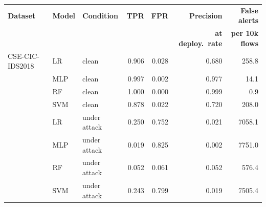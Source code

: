 \begin{tabular}{l l l r r r r}
\toprule
\textbf{Dataset} & \textbf{Model} & \textbf{Condition} & \textbf{TPR} & \textbf{FPR} & \textbf{Precision} & \textbf{False alerts} \\
 & & & & & \textbf{at deploy.\ rate} & \textbf{per 10k flows} \\
\midrule
CSE-CIC-IDS2018 & LR & clean & 0.906 & 0.028 & 0.680 & 258.8 \\
 & MLP & clean & 0.997 & 0.002 & 0.977 & 14.1 \\
 & RF & clean & 1.000 & 0.000 & 0.999 & 0.9 \\
 & SVM & clean & 0.878 & 0.022 & 0.720 & 208.0 \\
 & LR & under attack & 0.250 & 0.752 & 0.021 & 7058.1 \\
 & MLP & under attack & 0.019 & 0.825 & 0.002 & 7751.0 \\
 & RF & under attack & 0.052 & 0.061 & 0.052 & 576.4 \\
 & SVM & under attack & 0.243 & 0.799 & 0.019 & 7505.4 \\
\bottomrule
\end{tabular}